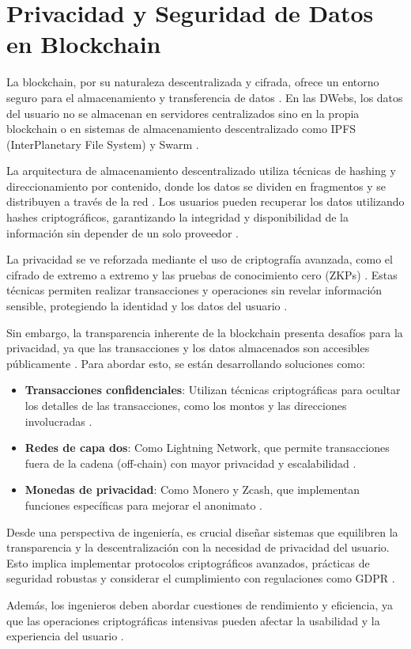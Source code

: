\section{Privacidad y Seguridad de Datos en Blockchain}

La blockchain, por su naturaleza descentralizada y cifrada, ofrece un entorno seguro para el almacenamiento y transferencia de datos \cite{bonneau2015sok}. En las DWebs, los datos del usuario no se almacenan en servidores centralizados sino en la propia blockchain o en sistemas de almacenamiento descentralizado como IPFS (InterPlanetary File System) \cite{benet2014ipfs} y Swarm \cite{swarm2016}.

La arquitectura de almacenamiento descentralizado utiliza técnicas de hashing y direccionamiento por contenido, donde los datos se dividen en fragmentos y se distribuyen a través de la red \cite{benet2014ipfs}. Los usuarios pueden recuperar los datos utilizando hashes criptográficos, garantizando la integridad y disponibilidad de la información sin depender de un solo proveedor \cite{wang2019survey}.

La privacidad se ve reforzada mediante el uso de criptografía avanzada, como el cifrado de extremo a extremo y las pruebas de conocimiento cero (ZKPs) \cite{ben2014zerocash}. Estas técnicas permiten realizar transacciones y operaciones sin revelar información sensible, protegiendo la identidad y los datos del usuario \cite{mohanty2018ethereum}.

Sin embargo, la transparencia inherente de la blockchain presenta desafíos para la privacidad, ya que las transacciones y los datos almacenados son accesibles públicamente \cite{meiklejohn2013fistful}. Para abordar esto, se están desarrollando soluciones como:

\begin{itemize}
    \item \textbf{Transacciones confidenciales}: Utilizan técnicas criptográficas para ocultar los detalles de las transacciones, como los montos y las direcciones involucradas \cite{maxwell2016confidential}.
    \item \textbf{Redes de capa dos}: Como Lightning Network, que permite transacciones fuera de la cadena (off-chain) con mayor privacidad y escalabilidad \cite{poon2016bitcoin}.
    \item \textbf{Monedas de privacidad}: Como Monero y Zcash, que implementan funciones específicas para mejorar el anonimato \cite{moser2018empirical}.
\end{itemize}

Desde una perspectiva de ingeniería, es crucial diseñar sistemas que equilibren la transparencia y la descentralización con la necesidad de privacidad del usuario. Esto implica implementar protocolos criptográficos avanzados, prácticas de seguridad robustas y considerar el cumplimiento con regulaciones como GDPR \cite{finck2018blockchain}.

Además, los ingenieros deben abordar cuestiones de rendimiento y eficiencia, ya que las operaciones criptográficas intensivas pueden afectar la usabilidad y la experiencia del usuario \cite{croman2016scaling}.

